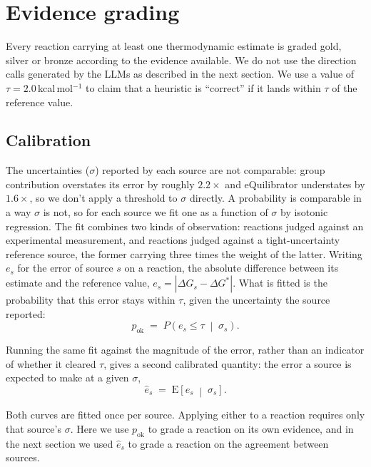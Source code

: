 \section{Evidence grading}\label{sec:s3}

Every reaction carrying at least one thermodynamic estimate is graded gold, silver or bronze according to the evidence available. We do not use the direction calls generated by the LLMs as described in the next section. We use a value of $\tau = 2.0$\,kcal\,mol$^{-1}$ to claim that a heuristic is ``correct'' if it lands within $\tau$ of the reference value.

\subsection{Calibration} The uncertainties ($\sigma$) reported by each source are not comparable: group contribution overstates its error by roughly $2.2\times$ and eQuilibrator understates by $1.6\times$, so we don't apply a threshold to $\sigma$ directly. A probability is comparable in a way $\sigma$ is not, so for each source we fit one as a function of $\sigma$ by isotonic regression. The fit combines two kinds of observation: reactions judged against an experimental measurement, and reactions judged against a tight-uncertainty reference source, the former carrying three times the weight of the latter. Writing $e_s$ for the error of source $s$ on a reaction, the absolute difference between its estimate and the reference value, $e_s = \left|\Delta G_s - \Delta G^{*}\right|$. What is fitted is the probability that this error stays within $\tau$, given the uncertainty the source reported: \begin{equation}
p_{\text{ok}} \;=\; P\!\left(e_s \le \tau \;\middle|\; \sigma_s\right). \label{eq:pok}
\end{equation}

Running the same fit against the magnitude of the error, rather than an indicator of whether it cleared $\tau$, gives a second calibrated quantity: the error a source is expected to make at a given $\sigma$,
\begin{equation}
\hat{e}_s \;=\; \mathrm{E}\!\left[e_s \;\middle|\; \sigma_s\right]. \label{eq:ehat}
\end{equation}

Both curves are fitted once per source. Applying either to a reaction requires only that source's $\sigma$. Here we use $p_{\text{ok}}$ to grade a reaction on its own evidence, and in the next section we used $\hat{e}_s$ to grade a reaction on the agreement between sources.


